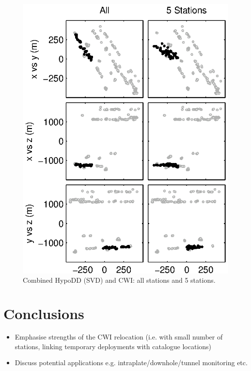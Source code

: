 \documentclass[extra]{gji}
\begin{document}
\begin{figure}
\includegraphics{diags/CalaverasLoc5_hypoDD_SVD.eps}
\caption{Combined HypoDD (SVD) and CWI: all stations and 5 stations.}
\label{fig-69Calaverasevents_eg1}
\end{figure}

\section{Conclusions}
\begin{itemize}
\item Emphasise strengths of the CWI relocation (i.e. with small number of stations,
linking temporary deployments with catalogue locations)
\item Discuss potential applications e.g. intraplate/downhole/tunnel monitoring etc.
\end{itemize}
\end{document}
